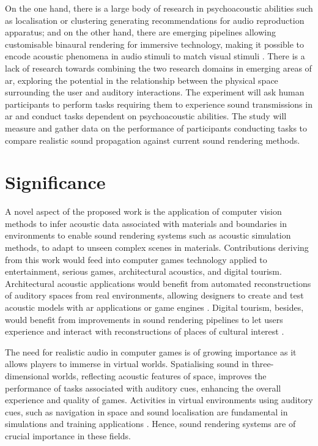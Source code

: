 On the one hand, there is a large body of research in psychoacoustic abilities such as localisation or clustering \citep{lee2011relationship} generating recommendations for audio reproduction apparatus; and on the other hand, there are emerging pipelines allowing customisable binaural rendering for immersive technology, making it possible to encode acoustic phenomena in audio stimuli to match visual stimuli \citep{plinge2018six}. There is a lack of research towards combining the two research domains in emerging areas of \acrshort{ar}, exploring the potential in the relationship between the physical space surrounding the user and auditory interactions. The experiment will ask human participants to perform tasks requiring them to experience sound transmissions in \acrshort{ar} and conduct tasks dependent on psychoacoustic abilities. The study will measure and gather data on the performance of participants conducting tasks to compare realistic sound propagation against current sound rendering methods.\par

\section{Significance}
A novel aspect of the proposed work is the application of computer vision methods to infer acoustic data associated with materials and boundaries in environments to enable sound rendering systems such as acoustic simulation methods, to adapt to unseen complex scenes in materials.
Contributions deriving from this work would feed into computer games technology applied to entertainment, serious games, architectural acoustics, and digital tourism. Architectural acoustic applications would benefit from automated reconstructions of auditory spaces from real environments, allowing designers to create and test acoustic models with \acrshort{ar} applications or game engines \citep{berardi2016acoustic}. Digital tourism, besides, would benefit from improvements in sound rendering pipelines to let users experience and interact with reconstructions of places of cultural interest \citep{schofield2018viking}.\par
The need for realistic audio in computer games is of growing importance as it allows players to immerse in virtual worlds. Spatialising sound in three-dimensional worlds, reflecting acoustic features of space, improves the performance of tasks associated with auditory cues, enhancing the overall experience and quality of games. 
Activities in virtual environments using auditory cues, such as navigation in space and sound localisation are fundamental in simulations and training applications \citep{lokki2005navigation}. Hence, sound rendering systems are of crucial importance in these fields.


